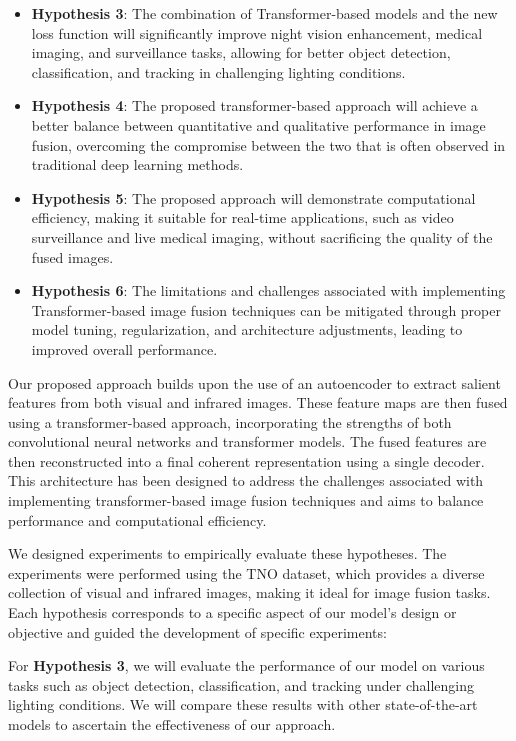 \begin{itemize}
    \item \textbf{Hypothesis 3}: The combination of Transformer-based models and the new loss function will significantly improve night vision enhancement, medical imaging, and surveillance tasks, allowing for better object detection, classification, and tracking in challenging lighting conditions.
    
    \item \textbf{Hypothesis 4}: The proposed transformer-based approach will achieve a better balance between quantitative and qualitative performance in image fusion, overcoming the compromise between the two that is often observed in traditional deep learning methods.
    
    \item \textbf{Hypothesis 5}: The proposed approach will demonstrate computational efficiency, making it suitable for real-time applications, such as video surveillance and live medical imaging, without sacrificing the quality of the fused images.
    
    \item \textbf{Hypothesis 6}: The limitations and challenges associated with implementing Transformer-based image fusion techniques can be mitigated through proper model tuning, regularization, and architecture adjustments, leading to improved overall performance.
\end{itemize}

Our proposed approach builds upon the use of an autoencoder to extract salient features from both visual and infrared images. These feature maps are then fused using a transformer-based approach, incorporating the strengths of both convolutional neural networks and transformer models. The fused features are then reconstructed into a final coherent representation using a single decoder. This architecture has been designed to address the challenges associated with implementing transformer-based image fusion techniques and aims to balance performance and computational efficiency.

We designed experiments to empirically evaluate these hypotheses. The experiments were performed using the TNO dataset, which provides a diverse collection of visual and infrared images, making it ideal for image fusion tasks. Each hypothesis corresponds to a specific aspect of our model's design or objective and guided the development of specific experiments:

For \textbf{Hypothesis 3}, we will evaluate the performance of our model on various tasks such as object detection, classification, and tracking under challenging lighting conditions. We will compare these results with other state-of-the-art models to ascertain the effectiveness of our approach.

